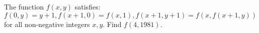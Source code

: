 The function $f(x,y)$ satisfies: $f(0,y)=y+1, f(x+1,0) = f(x,1), f(x+1,y+1)=f(x,f(x+1,y))$ for all non-negative integers $x,y$. Find $f(4,1981)$.